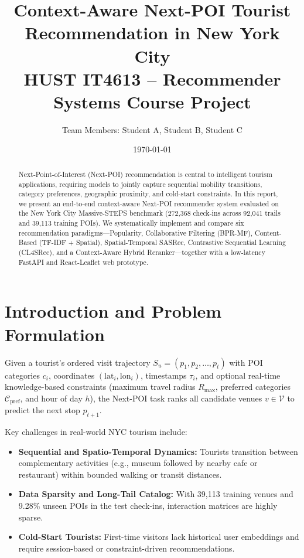 \documentclass[11pt,a4paper]{article}
\title{\textbf{Context-Aware Next-POI Tourist Recommendation in New York City}\\
\large HUST IT4613 -- Recommender Systems Course Project}
\author{Team Members: Student A, Student B, Student C}
\date{\today}
\begin{document}
\maketitle

\begin{abstract}
Next-Point-of-Interest (Next-POI) recommendation is central to intelligent tourism applications, requiring models to jointly capture sequential mobility transitions, category preferences, geographic proximity, and cold-start constraints. In this report, we present an end-to-end context-aware Next-POI recommender system evaluated on the New York City Massive-STEPS benchmark (272,368 check-ins across 92,041 trails and 39,113 training POIs). We systematically implement and compare six recommendation paradigms---Popularity, Collaborative Filtering (BPR-MF), Content-Based (TF-IDF + Spatial), Spatial-Temporal SASRec, Contrastive Sequential Learning (CL4SRec), and a Context-Aware Hybrid Reranker---together with a low-latency FastAPI and React-Leaflet web prototype.
\end{abstract}

\section{Introduction and Problem Formulation}
Given a tourist's ordered visit trajectory $S_u = (p_1, p_2, \dots, p_t)$ with POI categories $c_i$, coordinates $(\text{lat}_i, \text{lon}_i)$, timestamps $\tau_i$, and optional real-time knowledge-based constraints (maximum travel radius $R_{\max}$, preferred categories $\mathcal{C}_{\text{pref}}$, and hour of day $h$), the Next-POI task ranks all candidate venues $v \in \mathcal{V}$ to predict the next stop $p_{t+1}$.

Key challenges in real-world NYC tourism include:
\begin{itemize}
  \item \textbf{Sequential and Spatio-Temporal Dynamics:} Tourists transition between complementary activities (e.g., museum followed by nearby cafe or restaurant) within bounded walking or transit distances.
  \item \textbf{Data Sparsity and Long-Tail Catalog:} With 39,113 training venues and 9.28\% unseen POIs in the test check-ins, interaction matrices are highly sparse.
  \item \textbf{Cold-Start Tourists:} First-time visitors lack historical user embeddings and require session-based or constraint-driven recommendations.
\end{itemize}
\end{document}
